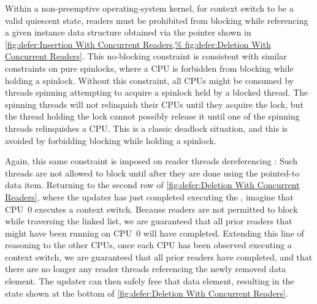 Within a non-preemptive operating-system kernel, for context switch to be
a valid quiescent state, readers must be prohibited from blocking while
referencing a given instance data structure obtained via the 
pointer shown in
\cref{fig:defer:Insertion With Concurrent Readers,%
fig:defer:Deletion With Concurrent Readers}.
This no-blocking constraint is consistent with similar constraints
on pure spinlocks, where a CPU is forbidden from blocking while
holding a spinlock.
Without this constraint, all CPUs might be consumed by threads
spinning attempting to acquire a spinlock held by a blocked thread.
The spinning threads will not relinquish their CPUs until they acquire
the lock, but the thread holding the lock cannot possibly release it
until one of the spinning threads relinquishes a CPU\@.
This is a classic deadlock situation, and this  is avoided
by forbidding blocking while holding a spinlock.

Again, this same constraint is imposed on reader threads dereferencing
:
Such threads are not allowed to block until after
they are done using the pointed-to data item.
Returning to the second row of
\cref{fig:defer:Deletion With Concurrent Readers},
where the updater has just completed executing the ,
imagine that CPU~0 executes a context switch.
Because readers are not permitted to block while traversing the linked
list, we are guaranteed that all prior readers that might have been running on
CPU~0 will have completed.
Extending this line of reasoning to the other CPUs, once each CPU has
been observed executing a context switch, we are guaranteed that all
prior readers have completed, and that there are no longer any reader
threads referencing the newly removed data element.
The updater can then safely free that data element, resulting in the
state shown at the bottom of
\cref{fig:defer:Deletion With Concurrent Readers}.

